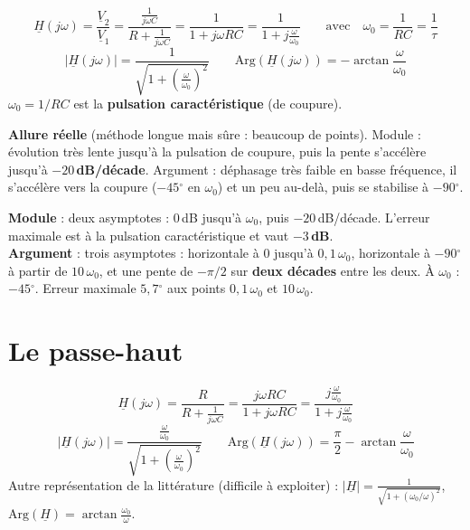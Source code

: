 \begin{exbox}[title={Passe-bas RC}]
\[ \underline H(j\omega) = \frac{\underline V_2}{\underline V_1} = \frac{\frac1{j\omega C}}{R + \frac1{j\omega C}}
   = \frac1{1 + j\omega RC} = \frac1{1 + j\frac{\omega}{\omega_0}}
   \qquad\text{avec}\quad \omega_0 = \frac1{RC} = \frac1\tau \]
\[ |\underline H(j\omega)| = \frac1{\sqrt{1 + \left(\frac\omega{\omega_0}\right)^2}} \qquad
   \mathrm{Arg}(\underline H(j\omega)) = -\arctan\frac{\omega}{\omega_0} \]
$\omega_0 = 1/RC$ est la \textbf{pulsation caractéristique} (de coupure).
\end{exbox}


\textbf{Allure réelle} (méthode longue mais sûre : beaucoup de points). Module : évolution
très lente jusqu'à la pulsation de coupure, puis la pente s'accélère jusqu'à
\textbf{$-20$\,dB/décade}. Argument : déphasage très faible en basse fréquence, il s'accélère
vers la coupure ($-45\ensuremath{^\circ}$ en $\omega_0$) et un peu au-delà, puis se stabilise à $-90\ensuremath{^\circ}$.


\begin{thmbox}[title=Approximation asymptotique du passe-bas]
\textbf{Module} : deux asymptotes : $0$\,dB jusqu'à $\omega_0$, puis $-20$\,dB/décade.
L'erreur maximale est à la pulsation caractéristique et vaut \textbf{$-3$\,dB}. \\
\textbf{Argument} : trois asymptotes : horizontale à $0$ jusqu'à $0{,}1\,\omega_0$,
horizontale à $-90\ensuremath{^\circ}$ à partir de $10\,\omega_0$, et une pente de $-\pi/2$ sur
\textbf{deux décades} entre les deux. À $\omega_0$ : $-45\ensuremath{^\circ}$. Erreur maximale
\textbf{$5{,}7\ensuremath{^\circ}$} aux points $0{,}1\,\omega_0$ et $10\,\omega_0$.
\end{thmbox}

\section{Le passe-haut}


\begin{exbox}[title={Passe-haut RC}]
\[ \underline H(j\omega) = \frac{R}{R + \frac1{j\omega C}} = \frac{j\omega RC}{1 + j\omega RC}
   = \frac{j\frac\omega{\omega_0}}{1 + j\frac\omega{\omega_0}} \]
\[ |\underline H(j\omega)| = \frac{\frac\omega{\omega_0}}{\sqrt{1 + \left(\frac\omega{\omega_0}\right)^2}} \qquad
   \mathrm{Arg}(\underline H(j\omega)) = \frac\pi2 - \arctan\frac\omega{\omega_0} \]
Autre représentation de la littérature (difficile à exploiter) :
$|\underline H| = \frac1{\sqrt{1 + (\omega_0/\omega)^2}}$,
$\mathrm{Arg}(\underline H) = \arctan\frac{\omega_0}{\omega}$.
\end{exbox}

